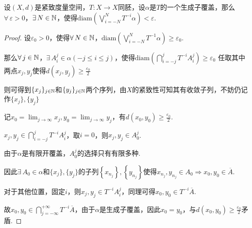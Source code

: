 \begin{lemma}{}
    设$(X,d)$是紧致度量空间，$T:X\to X$同胚，设$\alpha$是$T$的一个生成子覆盖，那么$\forall\,\varepsilon>0$，$\exists\, N\in\mathbb{N}$，使得$\mathrm{diam}\left(\bigvee_{i=-N}^NT^{-i}\alpha\right)<\varepsilon$.
\end{lemma}
\begin{proof}
    设$\varepsilon_0>0$，使得$\forall\, N\in\mathbb{N}$，$\mathrm{diam}\left(\bigvee_{i=-N}^N{T^{-1}\alpha}\right)\geq\varepsilon_0$.\par
    那么$\forall\, j\in\mathbb{N}$，$\exists\,A^j_i\in\alpha(-j\leq i\leq j)$，使得$\mathrm{diam}\left(\bigcap_{i=-j}^{j}T^{-i}A_i^j\right)\geq\varepsilon_0$
    任取其中两点$x_j,y_j$使得$d(x_j,y_j)\geq\frac{\varepsilon_0}{2}$\par
    则可得到$\{x_j\}_{j\in\mathbb{N}}$和$\{y_j\}_{j\in\mathbb{N}}$两个序列，由$X$的紧致性可知其有收敛子列，不妨仍记作$\{x_j\},\{y_j\}$\par
    记$x_0=\lim_{j\to\infty}{x_j},y_0=\lim_{j\to\infty}{y_j}$，有$d(x_0,y_0)\geq\frac{\varepsilon_0}{2}$.\par
    $x_j,y_j\in\bigcap_{i=-j}^jT^{-i}A^j_i$，取$i=0$，则$x_j,y_j\in A_0^j$.\par
    由于$\alpha$是有限开覆盖，$A_0^j$的选择只有有限多种.\par
    因此$\exists\, A_0\in\alpha$和$\{x_j\},\{y_j\}$的子列$\left\{x_{n_j}\right\},\left\{y_{n_j}\right\}$使得$x_{n_j},y_{n_j}\in A_0\Rightarrow x_0,y_0\in\overline{A}$.\par
    对于其他位置，固定$i$，则$x_j,y_j\in T^{-i}A_i^j$，同理可得$x_0,y_0\in T^{-i}\overline{A}$.\par
    故$x_0,y_0\in\bigcap_{j=-\infty}^{+\infty}T^{-i}\overline{A}$，由于$\alpha$是生成子覆盖，因此$x_0=y_0$，与$d(x_0,y_0)\geq\frac{\varepsilon_0}{2}$矛盾.
\end{proof}

